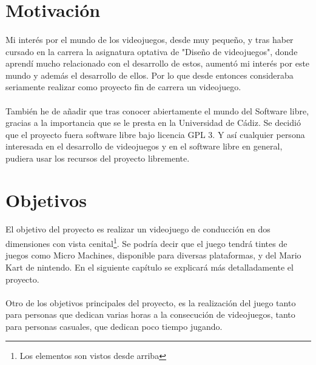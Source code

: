 \section{Motivación}

\paragraph{}
Mi interés por el mundo de los videojuegos, desde muy pequeño, y tras haber cursado en la carrera
la asignatura optativa de "Diseño de videojuegos", donde aprendí mucho
relacionado con el desarrollo de estos,
aumentó mi interés por este mundo y además el desarrollo de ellos. Por lo que desde entonces consideraba seriamente realizar 
como proyecto fin de carrera un videojuego.

\paragraph{}
También he de añadir que tras conocer abiertamente el mundo del Software libre, gracias a la importancia que se le presta
en la Universidad de Cádiz. Se decidió que el proyecto fuera software libre bajo licencia GPL 3. Y así cualquier persona
interesada en el desarrollo de videojuegos y en el software libre en general, pudiera usar los recursos del proyecto
libremente.

\section{Objetivos}

\paragraph{}
El objetivo del proyecto es realizar un videojuego de conducción en dos dimensiones con vista cenital\footnote{Los elementos son
vistos desde arriba}. Se podría decir que el juego tendrá tintes de juegos como Micro Machines, disponible para diversas 
plataformas, y del Mario Kart de nintendo. En el siguiente capítulo se explicará más detalladamente el proyecto.

\paragraph{}
Otro de los objetivos principales del proyecto, es la realización del juego tanto para personas que
dedican varias horas a la consecución de videojuegos, tanto para personas casuales, que dedican poco tiempo
jugando.

